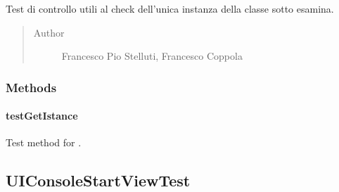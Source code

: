\documentclass[letterpaper,10pt,italian]{sphinxmanual}
\begin{document}
\begin{fulllineitems}
\label{\detokenize{test/it/unicam/cs/pa/mastermind/test/UIConsoleInteractionViewTest:it.unicam.cs.pa.mastermind.test.UIConsoleInteractionViewTest}}
Test di controllo utili al check dell’unica instanza della classe sotto esamina.
\begin{quote}\begin{description}
\item[{Author}] \leavevmode
Francesco Pio Stelluti, Francesco Coppola

\end{description}\end{quote}

\end{fulllineitems}



\subsubsection{Methods}
\label{\detokenize{test/it/unicam/cs/pa/mastermind/test/UIConsoleInteractionViewTest:methods}}

\paragraph{testGetIstance}
\label{\detokenize{test/it/unicam/cs/pa/mastermind/test/UIConsoleInteractionViewTest:testgetistance}}

\begin{fulllineitems}
\label{\detokenize{test/it/unicam/cs/pa/mastermind/test/UIConsoleInteractionViewTest:it.unicam.cs.pa.mastermind.test.UIConsoleInteractionViewTest.testGetIstance()}}
Test method for {\hyperref[\detokenize{source/it/unicam/cs/pa/mastermind/ui/ConsoleInteractionView:it.unicam.cs.pa.mastermind.ui.ConsoleInteractionView.getInstance()}]{}}.

\end{fulllineitems}



\subsection{UIConsoleStartViewTest}
\label{\detokenize{test/it/unicam/cs/pa/mastermind/test/UIConsoleStartViewTest:uiconsolestartviewtest}}\label{\detokenize{test/it/unicam/cs/pa/mastermind/test/UIConsoleStartViewTest::doc}}
\end{document}
